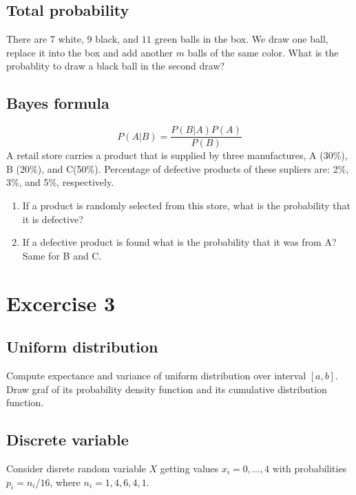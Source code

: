 \documentclass[4pt]{article}
\def\answer#1{}
\begin{document}
\subsection{Total probability}
There are $7$ white, $9$ black, and $11$ green balls in the box. We draw one ball, replace it into the box and add another $m$ balls of the same color. 
What is the probablity to draw a black ball in the second draw?
\answer{
\[
    \frac{7}{27}\cdot\frac{9}{27+m}+\frac{9}{27}\cdot\frac{9+m}{27+m}+\frac{11}{27}\cdot\frac{9}{27+m} = \frac{1}{3}
\]    
}

\subsection{Bayes formula}
\[
   P(A|B) = \frac{P(B | A) P(A)}{P(B)} 
\]
A retail store carries a product that is supplied by three manufactures, A (30\%), B (20\%), and C(50\%). 
Percentage of defective products of these supliers are: 2\%, 3\%, and 5\%, respectively.
\begin{enumerate}
 \item If a product is randomly selected from this store, what is the probability that it is
defective? \answer{ $P(D|A)P(A) + \dots=0.3*0.02 +0.2*0.03 + +0.5*0.05 = 0.037$ }
 \item If a defective product is found what is the probability that it was from A? Same for B and C.
 \answer{ 
 $P(A|D)=P(D|A)P(A)/P(D)=0.162$, $0.162$, $0.676$
 }
\end{enumerate}


\pagebreak

\section{Excercise 3}
\subsection{Uniform distribution}
Compute expectance and variance of uniform distribution over interval $[a,b]$.
Draw graf of its probability density function and its cumulative distribution function.

\subsection{Discrete variable}
Consider disrete random variable $X$ getting values $x_i=0,\dots,4$ with probabilities $p_i=n_i/16$, where
$n_i=1,4,6,4,1$.
\end{document}
